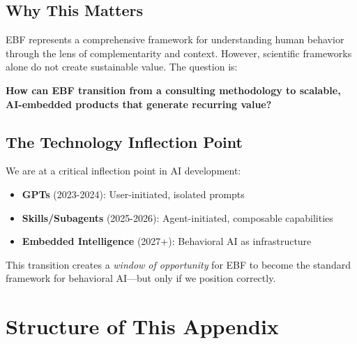 \subsection{Why This Matters}

EBF represents a comprehensive framework for understanding human behavior through the lens of complementarity and context. However, scientific frameworks alone do not create sustainable value. The question is:

\begin{tcolorbox}[colback=red!5!white, colframe=red!75!black,
    title=The Fundamental Question]
\textbf{How can EBF transition from a consulting methodology to scalable, AI-embedded products that generate recurring value?}
\end{tcolorbox}

\subsection{The Technology Inflection Point}

We are at a critical inflection point in AI development:

\begin{itemize}
\item \textbf{GPTs} (2023-2024): User-initiated, isolated prompts
\item \textbf{Skills/Subagents} (2025-2026): Agent-initiated, composable capabilities
\item \textbf{Embedded Intelligence} (2027+): Behavioral AI as infrastructure
\end{itemize}

This transition creates a \textit{window of opportunity} for EBF to become the standard framework for behavioral AI---but only if we position correctly.


\section{Structure of This Appendix}
\label{sec:vvv-structure}

